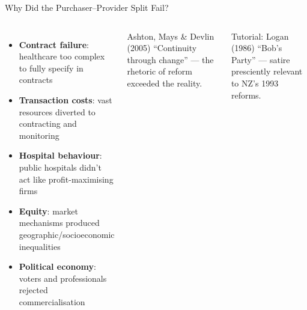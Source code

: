 \documentclass[aspectratio=169, 12pt]{beamer}
\begin{document}
\begin{frame}{Why Did the Purchaser--Provider Split Fail?}
  \begin{columns}
      \small
      \begin{itemize}
        \item \textbf{Contract failure}: healthcare too complex to fully specify in contracts
        \item \textbf{Transaction costs}: vast resources diverted to contracting and monitoring
        \item \textbf{Hospital behaviour}: public hospitals didn't act like profit-maximising firms
        \item \textbf{Equity}: market mechanisms produced geographic/socioeconomic inequalities
        \item \textbf{Political economy}: voters and professionals rejected commercialisation
      \end{itemize}
      \begin{alertblock}{Ashton, Mays \& Devlin (2005)}
        \small ``Continuity through change'' --- the rhetoric of reform exceeded the reality.
      \end{alertblock}
      \begin{exampleblock}{Tutorial: Logan (1986)}
        \small ``Bob's Party'' --- satire presciently relevant to NZ's 1993 reforms.
      \end{exampleblock}
  \end{columns}
\end{frame}

\end{document}
